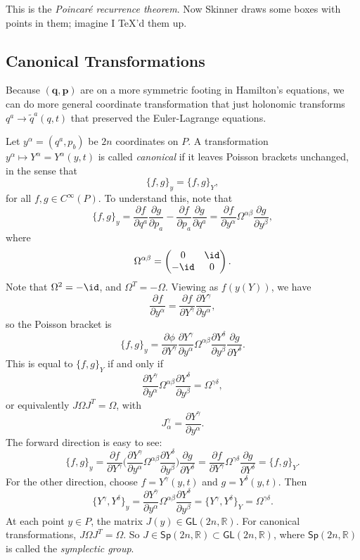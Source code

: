 \documentclass[12pt]{article}
\begin{document}
This is the \emph{Poincar\'e recurrence theorem}. Now Skinner draws some boxes with points in them; imagine I \TeX'd them up.

\subsection{Canonical Transformations}
\label{sub:can_trans}

Because $(\mathbf{q}, \mathbf{p})$ are on a more symmetric footing in Hamilton's equations, we can do more general coordinate transformation that just holonomic transforms $q^a \to \tilde q^a(q, t)$ that preserved the Euler-Lagrange equations.

Let $y^\alpha= (q^a, p_b)$ be $2n$ coordinates on $P$. A transformation $y^\alpha \mapsto Y^\alpha =  Y^\alpha(y, t)$ is called \emph{canonical} if it leaves Poisson brackets unchanged, in the sense that
\[
	\{f, g\}_y = \{f, g\}_Y,
\]
for all $f, g \in C^{\infty}(P)$. To understand this, note that
\[
	\{f, g\}_y = \frac{\partial f}{\partial q^a} \frac{\partial g}{\partial p_a} - \frac{\partial f}{\partial p_a} \frac{\partial g}{\partial q^a} = \frac{\partial f}{\partial y^\alpha} \Omega^{\alpha \beta} \frac{\partial g}{\partial y^\beta},
\]
where
\[
\Omega^{\alpha\beta} =
\begin{pmatrix}
	0 & \id \\
	-\id & 0
\end{pmatrix}.
\]
Note that $\Omega^2 = -\id$, and $\Omega^{T} = -\Omega$. Viewing as $f(y(Y))$, we have
\[
\frac{\partial f}{\partial y^{\alpha}} = \frac{\partial f}{\partial Y^{\gamma}} \frac{\partial Y^{\gamma}}{\partial y^{\alpha}},
\]
so the Poisson bracket is
\[
	\{f, g\}_y = \frac{\partial \phi}{\partial Y^{\gamma}} \frac{\partial Y^{\gamma}}{\partial y^{\alpha}} \Omega^{\alpha \beta} \frac{\partial Y^{\delta}}{\partial y^{\beta}} \frac{\partial g}{\partial Y^{\delta}}.
\]
This is equal to $\{f, g\}_Y$ if and only if
\[
\frac{\partial Y^{\gamma}}{\partial y^{\alpha}} \Omega^{\alpha \beta} \frac{\partial Y^{\delta}}{\partial y^{\beta}} = \Omega^{\gamma \delta},
\]
or equivalently $J \Omega J^{T} = \Omega$, with
\[
J^{\gamma}_\alpha = \frac{\partial Y^{\gamma}}{\partial y^{\alpha}}.
\]
The forward direction is easy to see:
\[
	\{f, g\}_y = \frac{\partial f}{\partial Y^{\gamma}} \biggl( \frac{\partial Y^{\gamma}}{\partial y^{\alpha}} \Omega^{\alpha \beta} \frac{\partial Y^{\delta}}{\partial y^{\beta}} \biggr)  \frac{\partial g}{\partial Y^{\delta}} = \frac{\partial f}{\partial Y^{\gamma}} \Omega^{\gamma \delta} \frac{\partial g}{\partial Y^{\delta}} = \{f, g\}_Y.
\]
For the other direction, choose $f = Y^{\gamma}(y, t)$ and $g = Y^{\delta}(y, t)$. Then
\[
	\{Y^{\gamma}, Y^{\delta}\}_y = \frac{\partial Y^{\gamma}}{\partial y^{\alpha}} \Omega^{\alpha \beta} \frac{\partial Y^{\delta}}{\partial y^{\beta}} = \{Y^{\gamma}, Y^{\delta}\}_Y = \Omega^{\gamma \delta}.
\]
At each point $y \in P$, the matrix $J(y) \in \mathsf{GL}(2n, \mathbb{R})$. For canonical transformations, $J \Omega J^{T} = \Omega$. So $J \in \mathsf{Sp}(2n, \mathbb{R}) \subset \mathsf{GL}(2n, \mathbb{R})$, where $\mathsf{Sp}(2n, \mathbb{R})$ is called the \emph{symplectic group}.
\end{document}
